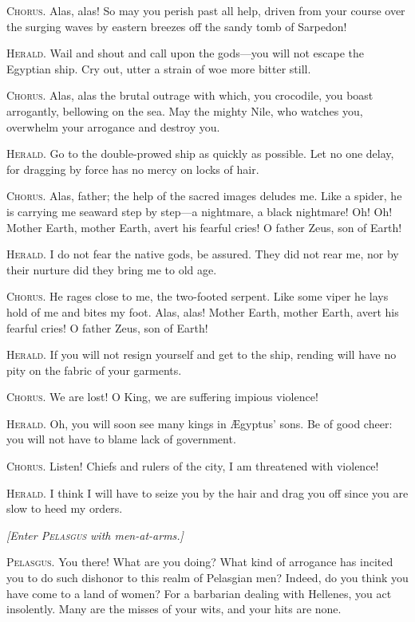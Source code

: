 \documentclass[12pt]{article}
\begin{document}
\textsc{Chorus.} Alas, alas! So may you perish past all help, driven from your course over the surging waves by eastern breezes off the sandy tomb of Sarpedon!

\textsc{Herald.} Wail and shout and call upon the gods---you will not escape the Egyptian ship. Cry out, utter a strain of woe more bitter still.

\textsc{Chorus.} Alas, alas the brutal outrage with which, you crocodile, you boast arrogantly, bellowing on the sea. May the mighty Nile, who watches you, overwhelm your arrogance and destroy you.

\textsc{Herald.} Go to the double-prowed ship as quickly as possible. Let no one delay, for dragging by force has no mercy on locks of hair.

\textsc{Chorus.} Alas, father; the help of the sacred images deludes me. Like a spider, he is carrying me seaward step by step---a nightmare, a black nightmare! Oh! Oh! Mother Earth, mother Earth, avert his fearful cries! O father Zeus, son of Earth!

\textsc{Herald.} I do not fear the native gods, be assured. They did not rear me, nor by their nurture did they bring me to old age.

\textsc{Chorus.} He rages close to me, the two-footed serpent. Like some viper he lays hold of me and bites my foot. Alas, alas! Mother Earth, mother Earth, avert his fearful cries! O father Zeus, son of Earth!

\textsc{Herald.} If you will not resign yourself and get to the ship, rending will have no pity on the fabric of your garments.

\textsc{Chorus.} We are lost! O King, we are suffering impious violence!

\textsc{Herald.} Oh, you will soon see many kings in {\AE}gyptus' sons. Be of good cheer: you will not have to blame lack of government.

\textsc{Chorus.} Listen! Chiefs and rulers of the city, I am threatened with violence!

\textsc{Herald.} I think I will have to seize you by the hair and drag you off since you are slow to heed my orders.

\begin{center}
\textit{[Enter \textsc{Pelasgus} with men-at-arms.]}
\end{center}

\textsc{Pelasgus.} You there! What are you doing? What kind of arrogance has incited you to do such dishonor to this realm of Pelasgian men? Indeed, do you think you have come to a land of women? For a barbarian dealing with Hellenes, you act insolently. Many are the misses of your wits, and your hits are none.
\end{document}
